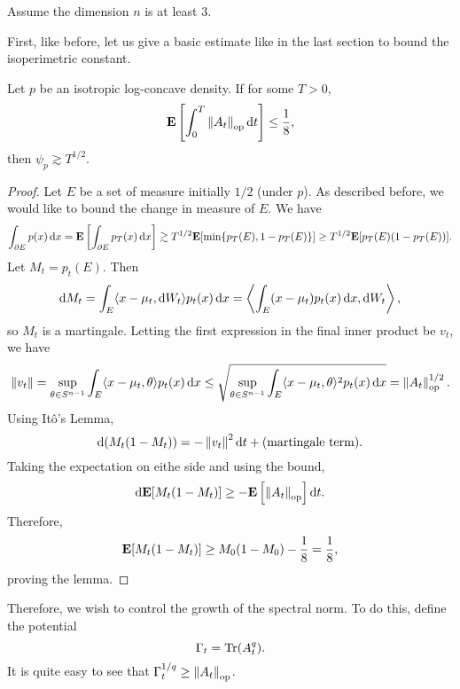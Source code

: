 		Assume the dimension $n$ is at least $3$.

		First, like before, let us give a basic estimate like in the last section to bound the isoperimetric constant.

		\begin{lemma}
			\label{chen basic estimate}
			Let $p$ be an isotropic log-concave density. If for some $T > 0$,
			\[ \textbf{E}\left[\int_0^T \left\lVert A_t\right\rVert_{\text{op}} \operatorname{d}\!{t} \right] \leq \frac{1}{8}, \]
			then $\psi_p \gtrsim T^{1/2}$.
		\end{lemma}
		\begin{proof}
			Let $E$ be a set of measure initially $1/2$ (under $p$). As described before, we would like to bound the change in measure of $E$.
			We have
			\[ \int_{\partial E} p(x) \operatorname{d}\!{x} = \textbf{E}\left[\int_{\partial E} p_T(x) \operatorname{d}\!{x}\right] \gtrsim T^{1/2} \textbf{E}[\min\{p_T(E),1-p_T(E)\}] \geq T^{1/2} \textbf{E}[p_T(E)(1-p_T(E))]. \]
			Let $M_t = p_t(E)$. Then
			\[ \operatorname{d}\!{M_t} = \int_E \langle x-\mu_t, \operatorname{d}\!{W}_t \rangle p_t(x) \operatorname{d}\!{x} = \left\langle \int_E (x-\mu_t) p_t(x) \operatorname{d}\!{x} , \operatorname{d}\!{W_t} \right\rangle, \]
			so $M_t$ is a martingale. Letting the first expression in the final inner product be $v_t$, we have
			\[ \left\lVert v_t\right\rVert = \sup_{\theta \in S^{n-1}} \int_E \langle x-\mu_t , \theta \rangle p_t(x) \operatorname{d}\!{x} \leq \sqrt{ \sup_{\theta \in S^{n-1}} \int_E \langle x-\mu_t , \theta \rangle^2 p_t(x) \operatorname{d}\!{x} } = \left\lVert A_t\right\rVert_{\text{op}}^{1/2}. \]
			Using It\^{o}'s Lemma,
			\[ \operatorname{d}\!{(M_t(1-M_t))} = -\left\lVert v_t\right\rVert^2\operatorname{d}\!{t} + \text{(martingale term)}. \]
			Taking the expectation on eithe side and using the bound,
			\[ \operatorname{d}\!{\textbf{E}[M_t(1-M_t)]} \geq -\textbf{E}\left[\left\lVert A_t\right\rVert_{\text{op}}\right]\operatorname{d}\!{t}. \]
			Therefore,
			\[ \textbf{E}[M_t(1-M_t)] \geq M_0(1-M_0) - \frac{1}{8} = \frac{1}{8}, \]
			proving the lemma.
		\end{proof}

		Therefore, we wish to control the growth of the spectral norm. To do this, define the potential
		\[ \Gamma_t = \operatorname{Tr}(A_t^q). \]
		It is quite easy to see that $\Gamma_t^{1/q} \geq \left\lVert A_t\right\rVert_{\text{op}}$.

